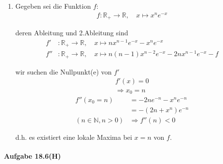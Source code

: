 \documentclass[11pt,a4paper]{article}
\begin{document}
\begin{enumerate}

\item[]

Gegeben sei die Funktion $f$:
\begin{align*}
f:\mathbb{R}_+ \rightarrow \mathbb{R},
\hspace{1em}
x\mapsto x^n e^{-x}
\end{align*}

deren Ableitung und 2.Ableitung sind
\begin{align*}
f'&:\mathbb{R}_+ \rightarrow \mathbb{R},
\hspace{1em}
x\mapsto n x^{n-1} e^{-x} - x^n e^{-x} \\
f''&:\mathbb{R}_+ \rightarrow \mathbb{R},
\hspace{1em}
x\mapsto n (n-1) x^{n-2} e^{-x} - 2 n x^{n-1} e^{-x} - f
\end{align*}

wir suchen die Nullpunkt(e) von $f'$
\begin{align*}
f'(x) = 0 \\
\Rightarrow x_0 = n
\end{align*}
\begin{align*}
f''(x_0=n)
&= -2 n e^{-n} - x^n e^{-n} \\
&= -( 2 n + x^n ) e^{-n} \\
(n\in\mathbb{N},n>0)
&\Rightarrow f''(n) < 0
\end{align*}

d.h. es existiert eine lokale Maxima bei $x=n$ von $f$.

\end{enumerate}

\newpage

\paragraph{Aufgabe 18.6(H)}
\end{document}
